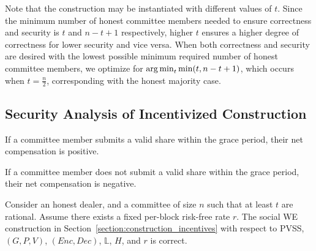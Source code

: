 Note that the construction may be instantiated with different values of $t$.
Since the minimum number of honest committee members needed to ensure correctness and security is $t$ and $n - t + 1$ respectively, higher $t$ ensures a higher degree of correctness for lower security and vice versa.
When both correctness and security are desired with the lowest possible minimum required number of honest committee members, we optimize for $\operatorname*{arg\,min}_{t} \min(t, n - t + 1)$, which occurs when $t = \frac{n}{2}$, corresponding with the honest majority case.

\subsection{Security Analysis of Incentivized Construction}
\begin{lemma}\label{lemma:honest_compensation}
    If a committee member submits a valid share within the grace period, their net compensation is positive.
\end{lemma}
\begin{lemma}\label{lemma:do_not_submit}
    If a committee member does not submit a valid share within the grace period, their net compensation is negative.
\end{lemma}
\begin{theorem}
    Consider an honest dealer, and a committee of size $n$ such that at least $t$ are rational.
    Assume there exists a fixed per-block risk-free rate $r$.
    The social WE construction in Section~\ref{section:construction_incentives} with respect to \textsf{PVSS}, $(G, P, V)$, $(Enc, Dec)$, $\mathbb{L}$, $H$, and $r$ is correct.
\end{theorem}
